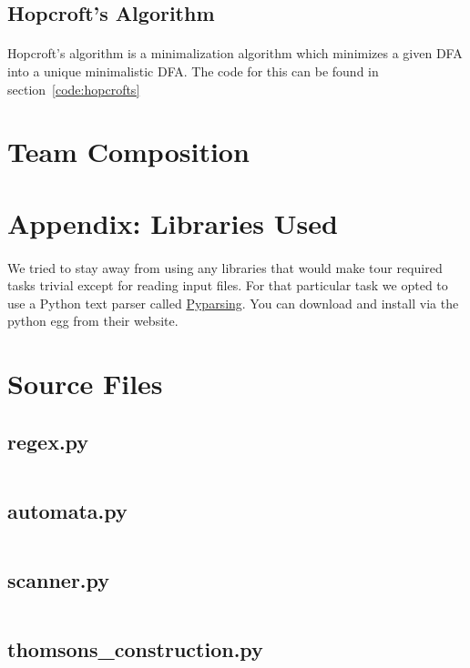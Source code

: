 \documentclass{article}
\begin{document}
\subsection{Hopcroft's Algorithm}
\paragraph{}Hopcroft's algorithm is a minimalization algorithm which minimizes a given DFA into a unique minimalistic DFA. The code for this can be found in section~\ref{code:hopcrofts}

\section{Team Composition}

\section{Appendix: Libraries Used}
\paragraph{} We tried to stay away from using any libraries that would make
tour required tasks trivial except for reading input files. For that
particular task we opted to use a Python text parser called
\href{http://pyparsing.wikispaces.com/}{Pyparsing}. You can download
and install via the python egg from their website.

\section{Source Files}
\subsection{regex.py}
\label{code:regex}
\inputminted{python}{./regex.py}

\subsection{automata.py}
\label{code:automata}
\inputminted{python}{./automata.py}

\subsection{scanner.py}
\label{code:scanner}
\inputminted{python}{./scanner.py}

\subsection{thomsons\_construction.py}
\label{code:thompsons}
\inputminted{python}{./thomsons_construction.py}
\end{document}
